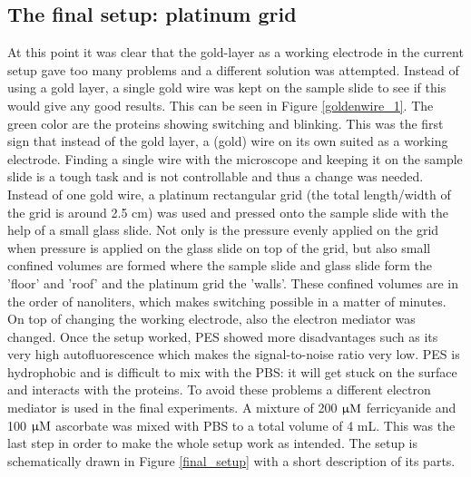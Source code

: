 \documentclass[twoside,single]{lion-msc}
\begin{document}
\subsection*{The final setup: platinum grid} \label{grid_1}
At this point it was clear that the gold-layer as a working electrode in the current setup gave too many problems and a different solution was attempted. Instead of using a gold layer, a single gold wire was kept on the sample slide to see if this would give any good results. This can be seen in Figure \ref{goldenwire_1}. The green color are the proteins showing switching and blinking. This was the first sign that instead of the gold layer, a (gold) wire on its own suited as a working electrode. Finding a single wire with the microscope and keeping it on the sample slide is a tough task and is not controllable and thus a change was needed. Instead of one gold wire, a platinum rectangular grid (the total length/width of the grid is around 2.5 cm) was used and pressed onto the sample slide with the help of a small glass slide. Not only is the pressure evenly applied on the grid when pressure is applied on the glass slide on top of the grid, but also small confined volumes are formed where the sample slide and glass slide form the 'floor' and 'roof' and the platinum grid the 'walls'. These confined volumes are in the order of nanoliters, which makes switching possible in a matter of minutes. On top of changing the working electrode, also the electron mediator was changed. Once the setup worked, PES showed more disadvantages such as its very high autofluorescence which makes the signal-to-noise ratio very low. PES is hydrophobic and is difficult to mix with the PBS: it will get stuck on the surface and interacts with the proteins. To avoid these problems a different electron mediator is used in the final experiments. A mixture of 200 $\upmu \textup{M}$ ferricyanide and 100 $\upmu \textup{M}$ ascorbate was mixed with PBS to a total volume of 4 mL. This was the last step in order to make the whole setup work as intended. The setup is schematically drawn in Figure \ref{final_setup} with a short description of its parts.
\end{document}
